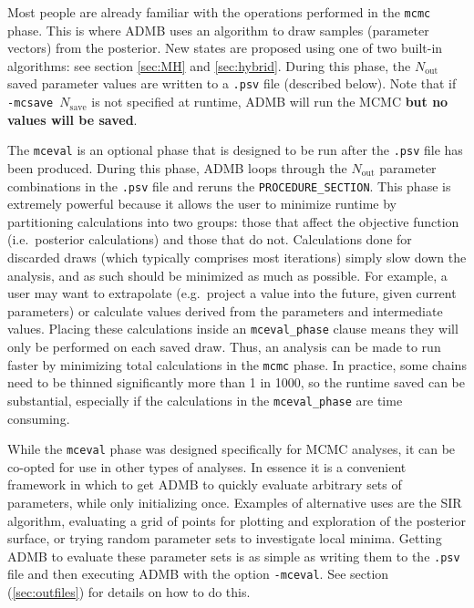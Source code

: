 \documentclass{article}\usepackage[]{graphicx}\usepackage[]{color}
\begin{document}
Most people are already familiar with the operations
performed in the \texttt{mcmc} phase. This is where ADMB
uses an algorithm to draw samples (parameter vectors) from
the posterior. New states are proposed using one of two
built-in algorithms: see section \ref{sec:MH} and
\ref{sec:hybrid}. During this phase, the $N_\text{out}$
saved parameter values are written to a \texttt{.psv} file
(described below). Note that if \texttt{-mcsave
  $N_\text{save}$} is not specified at runtime, ADMB will
run the MCMC \textbf{but no values will be saved}.

The \texttt{mceval} is an optional phase that is designed to
be run after the \texttt{.psv} file has been
produced. During this phase, ADMB loops through the
$N_\text{out}$ parameter combinations in the \texttt{.psv}
file and reruns the \texttt{PROCEDURE\_SECTION}. This phase
is extremely powerful because it allows the user to minimize
runtime by partitioning calculations into two groups: those
that affect the objective function (i.e.\ posterior
calculations) and those that do not. Calculations done for
discarded draws (which typically comprises most iterations)
simply slow down the analysis, and as such should be
minimized as much as possible. For example, a user may want
to extrapolate (e.g.\ project a value into the future, given
current parameters) or calculate values derived from the
parameters and intermediate values. Placing these
calculations inside an \texttt{mceval\_phase} clause means
they will only be performed on each saved draw. Thus, an
analysis can be made to run faster by minimizing total
calculations in the \texttt{mcmc} phase. In practice, some
chains need to be thinned significantly more than 1 in 1000,
so the runtime saved can be substantial, especially if the
calculations in the \texttt{mceval\_phase} are time
consuming.

While the \texttt{mceval} phase was designed specifically
for MCMC analyses, it can be co-opted for use in other types
of analyses. In essence it is a convenient framework in
which to get ADMB to quickly evaluate arbitrary sets of
parameters, while only initializing once. Examples of
alternative uses are the SIR algorithm, evaluating a grid of
points for plotting and exploration of the posterior
surface, or trying random parameter sets to investigate
local minima. Getting ADMB to evaluate these parameter sets
is as simple as writing them to the \texttt{.psv} file and
then executing ADMB with the option \texttt{-mceval}. See
section (\ref{sec:outfiles}) for details on how to do this.
\end{document}
